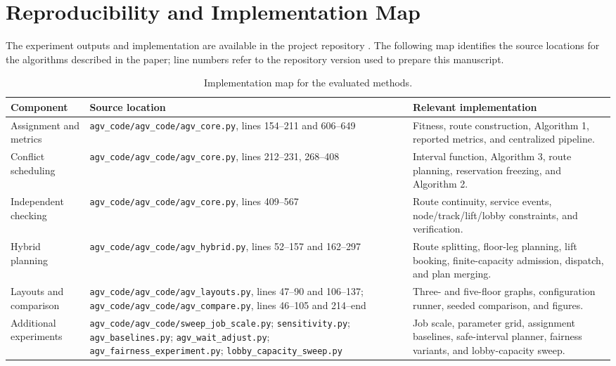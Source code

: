 \section{Reproducibility and Implementation Map}
\label{app:reproducibility}

The experiment outputs and implementation are available in the project
repository \cite{projectRepo}. The following map identifies the source
locations for the algorithms described in the paper; line numbers refer to
the repository version used to prepare this manuscript.

\begin{table}[t]
\centering
\footnotesize
\caption{Implementation map for the evaluated methods.}
\label{tab:implementation-map}
\begin{tabularx}{\textwidth}{>{\raggedright\arraybackslash}p{}>{\raggedright\arraybackslash}p{}X}
\toprule
Component & Source location & Relevant implementation \\
\midrule
Assignment and metrics & \texttt{agv\_code/agv\_code/agv\_core.py}, lines 154--211 and 606--649 & Fitness, route construction, Algorithm 1, reported metrics, and centralized pipeline. \\
Conflict scheduling & \texttt{agv\_code/agv\_code/agv\_core.py}, lines 212--231, 268--408 & Interval function, Algorithm 3, route planning, reservation freezing, and Algorithm 2. \\
Independent checking & \texttt{agv\_code/agv\_code/agv\_core.py}, lines 409--567 & Route continuity, service events, node/track/lift/lobby constraints, and verification. \\
Hybrid planning & \texttt{agv\_code/agv\_code/agv\_hybrid.py}, lines 52--157 and 162--297 & Route splitting, floor-leg planning, lift booking, finite-capacity admission, dispatch, and plan merging. \\
Layouts and comparison & \texttt{agv\_code/agv\_code/agv\_layouts.py}, lines 47--90 and 106--137; \texttt{agv\_code/agv\_code/agv\_compare.py}, lines 46--105 and 214--end & Three- and five-floor graphs, configuration runner, seeded comparison, and figures. \\
Additional experiments & \texttt{agv\_code/agv\_code/sweep\_job\_scale.py}; \texttt{sensitivity.py}; \texttt{agv\_baselines.py}; \texttt{agv\_wait\_adjust.py}; \texttt{agv\_fairness\_experiment.py}; \texttt{lobby\_capacity\_sweep.py} & Job scale, parameter grid, assignment baselines, safe-interval planner, fairness variants, and lobby-capacity sweep. \\
\bottomrule
\end{tabularx}
\end{table}


